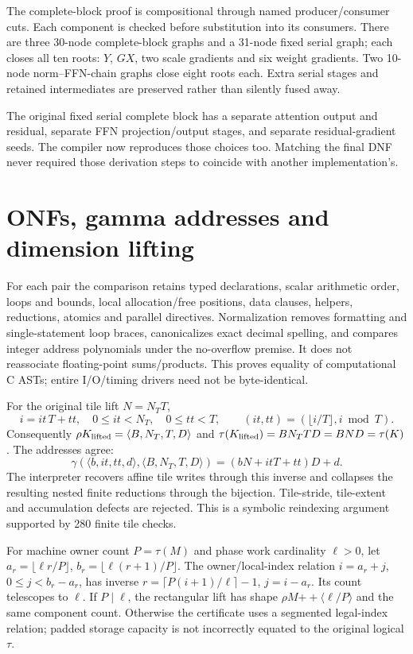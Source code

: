 The complete-block proof is compositional through named producer/consumer cuts.
Each component is checked before substitution into its consumers. There are
three 30-node complete-block graphs and a 31-node fixed serial graph; each closes
all ten roots: $Y$, $GX$, two scale gradients and six weight gradients. Two
10-node norm--FFN-chain graphs close eight roots each. Extra serial stages and
retained intermediates are preserved rather than silently fused away.

The original fixed serial complete block has a separate attention output and
residual, separate FFN projection/output stages, and separate residual-gradient
seeds. The compiler now reproduces those choices too. Matching the final DNF
never required those derivation steps to coincide with another implementation's.

\newpage\section{ONFs, gamma addresses and dimension lifting}
For each pair the comparison retains typed declarations, scalar arithmetic order,
loops and bounds, local allocation/free positions, data clauses, helpers,
reductions, atomics and parallel directives. Normalization removes formatting and
single-statement loop braces, canonicalizes exact decimal spelling, and compares
integer address polynomials under the no-overflow premise. It does not
reassociate floating-point sums/products. This proves equality of computational
C ASTs; entire I/O/timing drivers need not be byte-identical.

For the original tile lift $N=N_TT$,
\[
 i=it\,T+tt,\quad 0\le it<N_T,\quad0\le tt<T,
 \qquad (it,tt)=(\lfloor i/T\rfloor,i\bmod T).
\]
Consequently $\rho K_{\rm lifted}=\langle B,N_T,T,D\rangle$ and
$\tau(K_{\rm lifted})=BN_TTD=BND=\tau(K)$. The addresses agree:
\[
\gamma(\langle b,it,tt,d\rangle,\langle B,N_T,T,D\rangle)
 =(bN+itT+tt)D+d.
\]
The interpreter recovers affine tile writes through this inverse and collapses
the resulting nested finite reductions through the bijection. Tile-stride,
tile-extent and accumulation defects are rejected. This is a symbolic
reindexing argument supported by 280 finite tile checks.

For machine owner count $P=\tau(M)$ and phase work cardinality $\ell>0$,
let $a_r=\lfloor\ell r/P\rfloor$, $b_r=\lfloor\ell(r+1)/P\rfloor$.
The owner/local-index relation $i=a_r+j$, $0\le j<b_r-a_r$, has inverse
$r=\lceil P(i+1)/\ell\rceil-1$, $j=i-a_r$. Its count telescopes to $\ell$.
If $P\mid\ell$, the rectangular lift has shape
$\rho M\mathbin{+\!+}\langle\ell/P\rangle$ and the same component count.
Otherwise the certificate uses a segmented legal-index relation; padded storage
capacity is not incorrectly equated to the original logical $\tau$.

